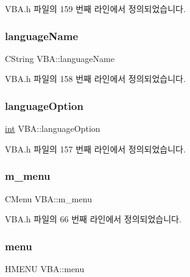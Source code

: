V\+B\+A.\+h 파일의 159 번째 라인에서 정의되었습니다.

\mbox{\label{class_v_b_a_a9763c257edcdac0bff2b0ecab70ffc80}} 
\subsubsection{\texorpdfstring{language\+Name}{languageName}}
{\footnotesize\ttfamily C\+String V\+B\+A\+::language\+Name}



V\+B\+A.\+h 파일의 158 번째 라인에서 정의되었습니다.

\mbox{\label{class_v_b_a_ac747a07ec2db4bcddea1b4581ebe5c6b}} 
\subsubsection{\texorpdfstring{language\+Option}{languageOption}}
{\footnotesize\ttfamily \mbox{\hyperlink{_util_8cpp_a0ef32aa8672df19503a49fab2d0c8071}{int}} V\+B\+A\+::language\+Option}



V\+B\+A.\+h 파일의 157 번째 라인에서 정의되었습니다.

\mbox{\label{class_v_b_a_a7f2defb31b3597bac8b7e372b2b12fba}} 
\subsubsection{\texorpdfstring{m\+\_\+menu}{m\_menu}}
{\footnotesize\ttfamily C\+Menu V\+B\+A\+::m\+\_\+menu}



V\+B\+A.\+h 파일의 66 번째 라인에서 정의되었습니다.

\mbox{\label{class_v_b_a_acf9d855b5b959a2df9c6cb21b888366e}} 
\subsubsection{\texorpdfstring{menu}{menu}}
{\footnotesize\ttfamily H\+M\+E\+NU V\+B\+A\+::menu}



